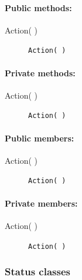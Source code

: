 \paragraph{Public methods:}
\begin{adjustwidth}{2.5em}{0pt}\begin{description}
		\item [Action( )] \texttt{Action( )}
\end{description}\end{adjustwidth}

\paragraph{Private methods:}
\begin{adjustwidth}{2.5em}{0pt}\begin{description}
		\item [Action( )] \texttt{Action( )}
\end{description}\end{adjustwidth}

\paragraph{Public members:}
\begin{adjustwidth}{2.5em}{0pt}\begin{description}
		\item [Action( )] \texttt{Action( )} 
\end{description}\end{adjustwidth}

\paragraph{Private members:}
\begin{adjustwidth}{2.5em}{0pt}\begin{description}
		\item [Action( )] \texttt{Action( )}
\end{description}\end{adjustwidth}

\subsubsection{Status classes}

